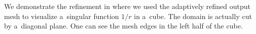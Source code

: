 We demonstrate the refinement in  where we used the adaptively refined output mesh to
visualize a~singular function $1/r$ in a~cube. The domain is actually cut by a~diagonal plane. One can see the mesh edges in
the left half of the cube.








% 
%   
%   
%   
%   
%   
